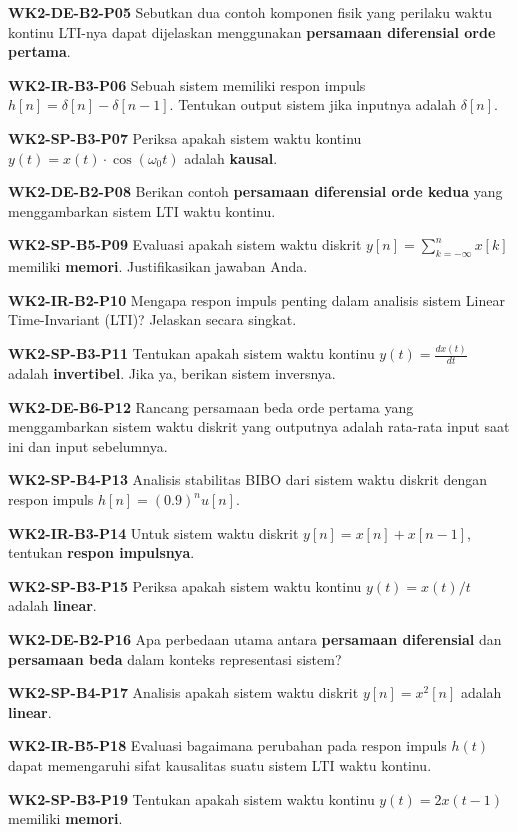 \documentclass[
  letterpaper,
  DIV=11,
  numbers=noendperiod]{scrreprt}
\begin{document}
\textbf{WK2-DE-B2-P05} Sebutkan dua contoh komponen fisik yang perilaku
waktu kontinu LTI-nya dapat dijelaskan menggunakan \textbf{persamaan
diferensial orde pertama}.

\textbf{WK2-IR-B3-P06} Sebuah sistem memiliki respon impuls
\(h[n] = \delta[n] - \delta[n-1]\). Tentukan output sistem jika inputnya
adalah \(\delta[n]\).

\textbf{WK2-SP-B3-P07} Periksa apakah sistem waktu kontinu
\(y(t) = x(t) \cdot \cos(\omega_0 t)\) adalah \textbf{kausal}.

\textbf{WK2-DE-B2-P08} Berikan contoh \textbf{persamaan diferensial orde
kedua} yang menggambarkan sistem LTI waktu kontinu.

\textbf{WK2-SP-B5-P09} Evaluasi apakah sistem waktu diskrit
\(y[n] = \sum_{k=-\infty}^{n} x[k]\) memiliki \textbf{memori}.
Justifikasikan jawaban Anda.

\textbf{WK2-IR-B2-P10} Mengapa respon impuls penting dalam analisis
sistem Linear Time-Invariant (LTI)? Jelaskan secara singkat.

\textbf{WK2-SP-B3-P11} Tentukan apakah sistem waktu kontinu
\(y(t) = \frac{dx(t)}{dt}\) adalah \textbf{invertibel}. Jika ya, berikan
sistem inversnya.

\textbf{WK2-DE-B6-P12} Rancang persamaan beda orde pertama yang
menggambarkan sistem waktu diskrit yang outputnya adalah rata-rata input
saat ini dan input sebelumnya.

\textbf{WK2-SP-B4-P13} Analisis stabilitas BIBO dari sistem waktu
diskrit dengan respon impuls \(h[n] = (0.9)^n u[n]\).

\textbf{WK2-IR-B3-P14} Untuk sistem waktu diskrit
\(y[n] = x[n] + x[n-1]\), tentukan \textbf{respon impulsnya}.

\textbf{WK2-SP-B3-P15} Periksa apakah sistem waktu kontinu
\(y(t) = x(t)/t\) adalah \textbf{linear}.

\textbf{WK2-DE-B2-P16} Apa perbedaan utama antara \textbf{persamaan
diferensial} dan \textbf{persamaan beda} dalam konteks representasi
sistem?

\textbf{WK2-SP-B4-P17} Analisis apakah sistem waktu diskrit
\(y[n] = x^2[n]\) adalah \textbf{linear}.

\textbf{WK2-IR-B5-P18} Evaluasi bagaimana perubahan pada respon impuls
\(h(t)\) dapat memengaruhi sifat kausalitas suatu sistem LTI waktu
kontinu.

\textbf{WK2-SP-B3-P19} Tentukan apakah sistem waktu kontinu
\(y(t) = 2x(t-1)\) memiliki \textbf{memori}.
\end{document}
